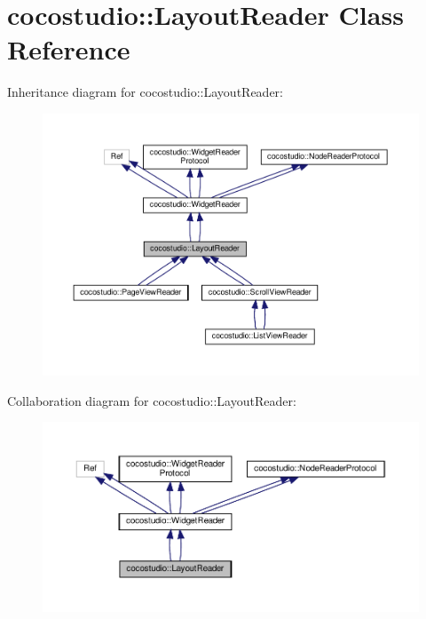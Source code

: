 \hypertarget{classcocostudio_1_1LayoutReader}{}\section{cocostudio\+:\+:Layout\+Reader Class Reference}
\label{classcocostudio_1_1LayoutReader}


Inheritance diagram for cocostudio\+:\+:Layout\+Reader\+:
\nopagebreak
\begin{figure}[H]
\begin{center}
\leavevmode
\includegraphics[width=350pt]{classcocostudio_1_1LayoutReader__inherit__graph}
\end{center}
\end{figure}


Collaboration diagram for cocostudio\+:\+:Layout\+Reader\+:
\nopagebreak
\begin{figure}[H]
\begin{center}
\leavevmode
\includegraphics[width=350pt]{classcocostudio_1_1LayoutReader__coll__graph}
\end{center}
\end{figure}
